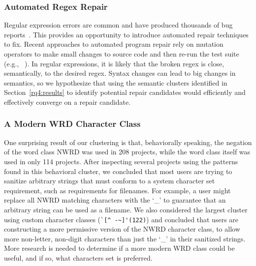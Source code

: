 \subsubsection{Automated Regex Repair}
Regular expression errors are common and have produced thousands of bug reports~\cite{Spishak:2012:TSR:2318202.2318207}. This provides an opportunity to introduce automated repair techniques to fix. 
Recent approaches to automated program repair rely on mutation operators to make small changes to source code and then re-run the test suite (e.g., ~\cite{cacm10, genprog-tse-journal}). In regular expressions, it is likely that the broken regex is close, semantically, to the desired regex. Syntax changes can lead to big changes in semantics, so we hypothesize that using the semantic clusters identified in Section~\ref{rq4:results} to identify potential repair candidates would efficiently and effectively converge on a repair candidate. 


\subsubsection{A Modern WRD Character Class}
One surprising result of our clustering is that, behaviorally speaking, the negation of the word class NWRD was used in 208 projects, while the word class itself was used in only 114 projects. After inspecting several projects using the patterns found in this behavioral cluster, we concluded that most users are trying to sanitize arbitrary strings that must conform to a system character set requirement, such as requirements for filenames.  For example, a user might replace all NWRD matching characters with the `\_' to guarantee that an arbitrary string can be used as a filename.  We also considered the largest cluster using custom character classes (\verb?`[^ -~]'(122)?) and concluded that users are constructing a more permissive version of the NWRD character class, to allow more non-letter, non-digit characters than just the `\_' in their sanitized strings.  More research is needed to determine if a more modern WRD class could be useful, and if so, what characters set is preferred.


